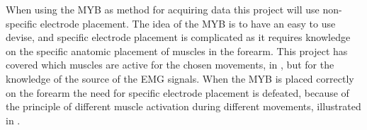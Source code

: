 When using the MYB as method for acquiring data this project will use non-specific electrode placement. The idea of the MYB is to have an easy to use devise, and specific electrode placement is complicated as it requires knowledge on the specific anatomic placement of muscles in the forearm. This project has covered which muscles are active for the chosen movements, in , but for the knowledge of the source of the EMG signals. When the MYB is placed correctly on the forearm the need for specific electrode placement is defeated, because of the principle of different muscle activation during different movements, illustrated in . 